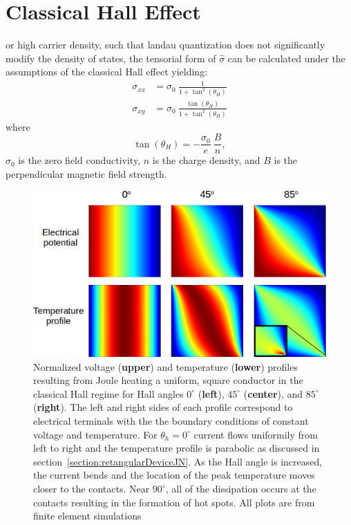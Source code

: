 \section{Classical Hall Effect}
 or high carrier density, such that landau quantization does not significantly modify the density of states, the tensorial form of $\hat\sigma$ can be calculated under the assumptions of the classical Hall effect yielding:
\begin{align}
\sigma_{xx} &= \sigma_0~\frac{1}{1+\tan^2(\theta_H)} \nonumber\\
\sigma_{xy} &= \sigma_0~\frac{\tan(\theta_H)}{1+\tan^2(\theta_H)} \label{eq:hall_sigma}
\end{align}
where
\begin{equation}
\tan(\theta_H) = -\frac{\sigma_0}{e}~\frac{B}{n},
\end{equation}
$\sigma_0$ is the zero field conductivity, $n$ is the charge density, and $B$ is the perpendicular magnetic field strength. 
\begin{figure}
\centering
\includegraphics[width=120mm]{figures/magneto/Hall_profiles.png}
\caption{Normalized voltage (\textbf{upper}) and temperature (\textbf{lower}) profiles resulting from Joule heating a uniform, square conductor in the classical Hall regime for Hall angles $0^\circ$ (\textbf{left}), $45^\circ$ (\textbf{center}), and $85^\circ$ (\textbf{right}). The left and right sides of each profile correspond to electrical terminals with the the boundary conditions of constant voltage and temperature. For $\theta_h=0^\circ$ current flows uniformily from left to right and the temperature profile is parabolic as discussed in section~\ref{section:retangularDeviceJN}. As the Hall angle is increased, the current bends and the location of the peak temperature moves closer to the contacts. Near $90^\circ$, all of the dissipation occurs at the contacts resulting in the formation of hot spots. All plots are from finite element simulations~\cite{noauthor_comsol_2017}}
\label{fig:m_Hall_profiles}
\end{figure}

